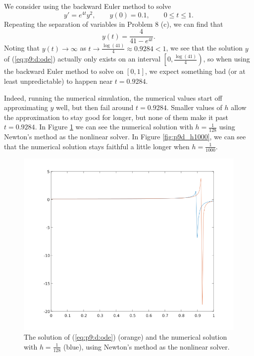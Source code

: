 \documentclass{homework}
\begin{document}
\begin{alphaparts}
			\questionpart We consider using the backward Euler method to solve
			\begin{equation}
				\label{eq:p9:d:ode}
				y' = e^{4t}y^2, \qquad y(0) = 0.1, \qquad 0\le t\le 1.
			\end{equation}
			Repeating the separation of variables in Problem 8 (c), we can find that
			\begin{equation}
				y(t) = \frac{4}{41 - e^{4t}}.
			\end{equation}
			Noting that $y(t) \to\infty$ as $t\to \frac{\log(41)}{4} \approx 0.9284 < 1$, we see that the solution $y$ of (\ref{eq:p9:d:ode}) actually only exists on an interval $\left[0, \frac{\log(41)}{4}\right)$, so when using the backward Euler method to solve on $[0,1]$, we expect something bad (or at least unpredictable) to happen near $t = 0.9284$.
			
			Indeed, running the numerical simulation, the numerical values start off approximating $y$ well, but then fail around $t = 0.9284$. Smaller values of $h$ allow the approximation to stay good for longer, but none of them make it past $t = 0.9284$. In Figure \ref{fig:p9d_h128} we can see the numerical solution with $h=\frac{1}{128}$ using Newton's method as the nonlinear solver. In Figure \ref{fig:p9d_h1000}, we can see that the numerical solution stays faithful a little longer when $h = \frac{1}{1000}$.
			
			\begin{figure}[H]
				\centering
				\includegraphics[width=0.9\linewidth]{plot_p9d_h128.png}
				\caption{The solution of (\ref{eq:p9:d:ode}) (orange) and the numerical solution with $h=\frac{1}{128}$ (blue), using Newton's method as the nonlinear solver.}
				\label{fig:p9d_h128}
			\end{figure}
			

\end{alphaparts}
\end{document}
